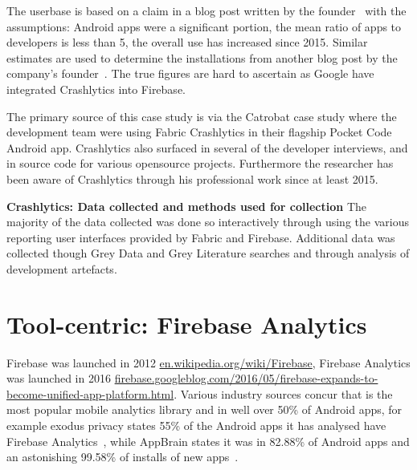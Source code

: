 The userbase is based on a claim in a blog post written by the founder~ with the assumptions: Android apps were a significant portion, the mean ratio of apps to developers is less than 5, the overall use has increased since 2015. 
Similar estimates are used to determine the installations from another blog post by the company's founder~. The true figures are hard to ascertain as Google have integrated Crashlytics into Firebase.

The primary source of this case study is via the Catrobat case study where the development team were using Fabric Crashlytics in their flagship Pocket Code Android app. Crashlytics also surfaced in several of the developer interviews, and in source code for various opensource projects. Furthermore the researcher has been aware of Crashlytics through his professional work since at least 2015.

\textbf{Crashlytics: Data collected and methods used for collection}
The majority of the data collected was done so interactively through using the various reporting user interfaces provided by Fabric and Firebase. Additional data was collected though Grey Data and Grey Literature searches and through analysis of development artefacts.



\section{Tool-centric: Firebase Analytics} 
Firebase was launched in 2012 \href{https://en.wikipedia.org/wiki/Firebase}{en.wikipedia.org/wiki/Firebase}, Firebase Analytics was launched in 2016 \href{https://firebase.googleblog.com/2016/05/firebase-expands-to-become-unified-app-platform.html}{firebase.googleblog.com/2016/05/firebase-expands-to-become-unified-app-platform.html}. Various industry sources concur that  is the most popular mobile analytics library and in well over 50\% of Android apps, for example exodus privacy states 55\% of the Android apps it has analysed have Firebase Analytics~, while AppBrain states it was in 82.88\% of Android apps and an astonishing 99.58\% of installs of new apps~. 


